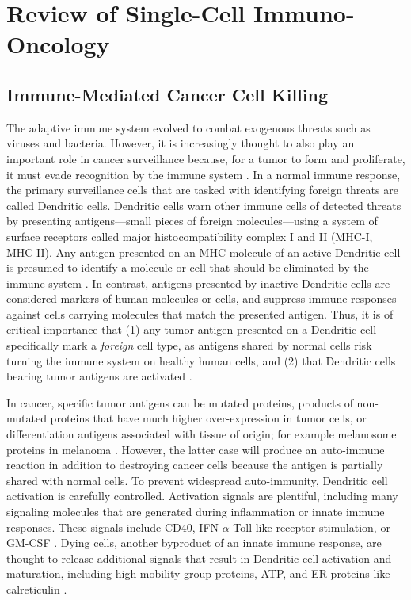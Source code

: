
\chapter[Review of Single-Cell Immuno-Oncology][Review of Single-Cell Immuno-Oncology]{Review of Single-Cell Immuno-Oncology}


\section{Immune-Mediated Cancer Cell Killing}

The adaptive immune system evolved to combat exogenous threats such as viruses and bacteria. 
However, it is increasingly thought to also play an important role in cancer surveillance because, for a tumor to form and proliferate, it must evade recognition by the immune system \citep{Corthay2014}. 
In a normal immune response, the primary surveillance cells that are tasked with identifying foreign threats are called Dendritic cells. 
Dendritic cells warn other immune cells of detected threats by presenting antigens---small pieces of foreign molecules---using a system of surface receptors called major histocompatibility complex I and II (MHC-I, MHC-II).
Any antigen presented on an MHC molecule of an active Dendritic cell is presumed to identify a molecule or cell that should be eliminated by the immune system \citep{Joffre2009}.
In contrast, antigens presented by inactive Dendritic cells are considered markers of human molecules or cells, and suppress immune responses against cells carrying molecules that match the presented antigen.  
Thus, it is of critical importance that (1) any tumor antigen presented on a Dendritic cell specifically mark a \textit{foreign} cell type, as antigens shared by normal cells risk turning the immune system on healthy human cells, and (2) that Dendritic cells bearing tumor antigens are activated \citep{Darrasse-Jeze2009,Steinman2000}.

In cancer, specific tumor antigens can be mutated proteins, products of non-mutated proteins that have much higher over-expression in tumor cells, or differentiation antigens associated with tissue of origin; for example melanosome proteins in melanoma \citep{Boon2006,Segal2008}.
However, the latter case will produce an auto-immune reaction in addition to destroying cancer cells because the antigen is partially shared with normal cells.
To prevent widespread auto-immunity, Dendritic cell activation is carefully controlled.
Activation signals are plentiful, including many signaling molecules that are generated during inflammation or innate immune responses.
These signals include CD40, IFN-$\alpha$ Toll-like receptor stimulation, or GM-CSF \citep{Lippitz2013}. 
Dying cells, another byproduct of an innate immune response, are thought to release additional signals that result in Dendritic cell activation and maturation, including high mobility group proteins, ATP, and ER proteins like calreticulin \citep{Zitvogel2009}.

